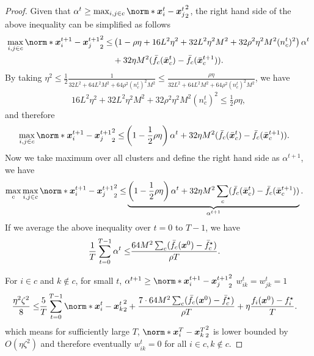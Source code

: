 \documentclass{article}
\begin{document}
\begin{proof}
    Given that $\alpha^t\ge\max_{i,j\in c} \norm*{ \xx_i^t - \xx_j^t}_2^2$, the right hand side of the above inequality can be simplified as follows
    \begin{align*}
      \max_{i,j\in c} \norm*{\xx_i^{t+1} - \xx_j^{t+1}}_2^2 
      \le& \left(1 -\rho\eta + 16L^2\eta^2 + 32L^2\eta^2M^2 + 32\rho^2 \eta^2M^2  (n_c^t)^2 \right) \alpha^t  \\
      &+ 32\eta M^2(\bar{f}_c(\bar{\xx}_c^{t}) - \bar{f}_c(\bar{\xx}_c^{t+1})).
    \end{align*}
    By taking $\eta^2 \le \frac{1}{2} \frac{1}{32L^2 + 64L^2M^2 + 64\rho^2(n_c^t)^2M^2} \le \frac{\rho\eta}{32L^2 + 64L^2M^2 + 64\rho^2(n_c^t)^2M^2}$, we have
    \begin{align*}
      16L^2\eta^2 + 32L^2\eta^2M^2 + 32\rho^2 \eta^2M^2  (n_c^t)^2 \le \frac{1}{2} \rho\eta ,
    \end{align*}
    and therefore
    \begin{align*}
      \max_{i,j\in c} \norm*{\xx_i^{t+1} - \xx_j^{t+1}}_2^2 
      \le& \left(1 - \frac{1}{2}\rho\eta  \right) \alpha^t + 32\eta M^2(\bar{f}_c(\bar{\xx}_c^{t}) - \bar{f}_c(\bar{\xx}_c^{t+1})).
    \end{align*}
    Now we take maximum over all clusters and define the right hand side as $\alpha^{t+1}$, we have
    \begin{align*}
      \max_c\max_{i,j\in c} \norm*{\xx_i^{t+1} - \xx_j^{t+1}}_2^2 
      \le& \underbrace{\left(1 - \frac{1}{2}\rho\eta \right) \alpha^t + 32\eta M^2 \sum_c (\bar{f}_c(\bar{\xx}_c^{t}) - \bar{f}_c(\bar{\xx}_c^{t+1}))}_{\alpha^{t+1}}.
    \end{align*}
    If we average the above inequality over $t=0$ to $T-1$, we have
    \begin{align*}
      \frac{1}{T}\sum_{t=0}^{T-1} \alpha^t
      \le&   \frac{64M^2 \sum_c(\bar{f}_c(\bm{x}^0) - \bar{f}_c^\star)}{\rho T} .
    \end{align*}

    For $i\in c$ and $k\notin c$, for small $t$, 
    $\alpha^{t+1}\ge\norm*{\xx_i^{t+1} - \xx_j^{t+1}}_2^2$
    $w_{ik}^t=w_{jk}^t=1$
    \begin{align*}
    \frac{\eta^2\zeta^2}{8}\le& 
    \frac{5}{T}\sum_{t=0}^{T-1} \norm*{\xx_i^t - \xx_k^t}_2^2
    + \frac{7\cdot 64M^2 \sum_c(\bar{f}_c(\xx^0) - \bar{f}_c^\star)}{\rho T}
    + \eta \frac{f_i(\xx^0) - f_i^\star}{T}.
    \end{align*}
    which means for sufficiently large $T$, $\norm*{\xx_i^T - \xx_k^T}_2^2$ is lower bounded by $O(\eta\zeta^2)$ and therefore eventually $w_{ik}^t = 0$ for all $i\in c,k\notin c$.
\end{proof}
\end{document}
